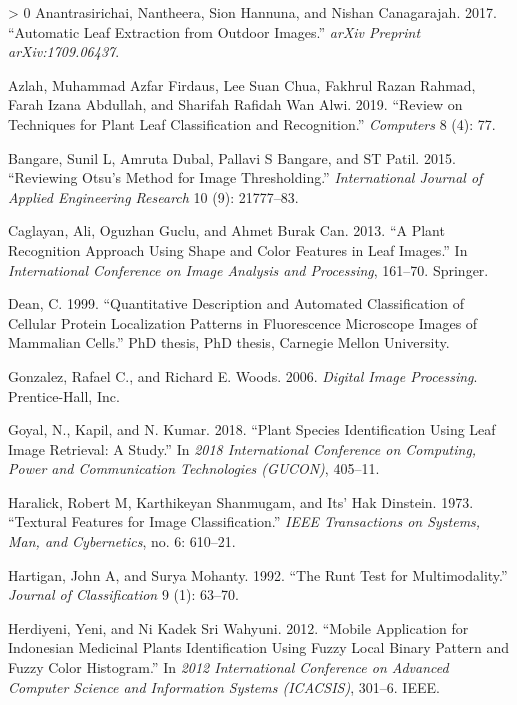 \documentclass{article}
\newlength{\cslhangindent}
\newenvironment{CSLReferences}[3] %
 {%
  \setlength{\parindent}{0pt}
  \ifodd #1 \everypar{\setlength{\hangindent}{\cslhangindent}}\ignorespaces\fi
  \ifnum #2 > 0
  \setlength{\parskip}{#2\baselineskip}
  \fi
 }%
 {}
\begin{document}
\hypertarget{refs}{}
\begin{CSLReferences}{1}{0}
\leavevmode\hypertarget{ref-DBLP}{}%
Anantrasirichai, Nantheera, Sion Hannuna, and Nishan Canagarajah. 2017.
{``Automatic Leaf Extraction from Outdoor Images.''} \emph{arXiv
Preprint arXiv:1709.06437}.

\leavevmode\hypertarget{ref-articlepl}{}%
Azlah, Muhammad Azfar Firdaus, Lee Suan Chua, Fakhrul Razan Rahmad,
Farah Izana Abdullah, and Sharifah Rafidah Wan Alwi. 2019. {``Review on
Techniques for Plant Leaf Classification and Recognition.''}
\emph{Computers} 8 (4): 77.

\leavevmode\hypertarget{ref-bangare2015reviewing}{}%
Bangare, Sunil L, Amruta Dubal, Pallavi S Bangare, and ST Patil. 2015.
{``Reviewing Otsu's Method for Image Thresholding.''}
\emph{International Journal of Applied Engineering Research} 10 (9):
21777--83.

\leavevmode\hypertarget{ref-inproceedings1}{}%
Caglayan, Ali, Oguzhan Guclu, and Ahmet Burak Can. 2013. {``A Plant
Recognition Approach Using Shape and Color Features in Leaf Images.''}
In \emph{International Conference on Image Analysis and Processing},
161--70. Springer.

\leavevmode\hypertarget{ref-article31}{}%
Dean, C. 1999. {``Quantitative Description and Automated Classification
of Cellular Protein Localization Patterns in Fluorescence Microscope
Images of Mammalian Cells.''} PhD thesis, PhD thesis, Carnegie Mellon
University.

\leavevmode\hypertarget{ref-book1}{}%
Gonzalez, Rafael C., and Richard E. Woods. 2006. \emph{Digital Image
Processing}. Prentice-Hall, Inc.

\leavevmode\hypertarget{ref-8675114}{}%
Goyal, N., Kapil, and N. Kumar. 2018. {``Plant Species Identification
Using Leaf Image Retrieval: A Study.''} In \emph{2018 International
Conference on Computing, Power and Communication Technologies (GUCON)},
405--11.

\leavevmode\hypertarget{ref-articletx}{}%
Haralick, Robert M, Karthikeyan Shanmugam, and Its' Hak Dinstein. 1973.
{``Textural Features for Image Classification.''} \emph{IEEE
Transactions on Systems, Man, and Cybernetics}, no. 6: 610--21.

\leavevmode\hypertarget{ref-hartigan1992runt}{}%
Hartigan, John A, and Surya Mohanty. 1992. {``The Runt Test for
Multimodality.''} \emph{Journal of Classification} 9 (1): 63--70.

\leavevmode\hypertarget{ref-inproceedings}{}%
Herdiyeni, Yeni, and Ni Kadek Sri Wahyuni. 2012. {``Mobile Application
for Indonesian Medicinal Plants Identification Using Fuzzy Local Binary
Pattern and Fuzzy Color Histogram.''} In \emph{2012 International
Conference on Advanced Computer Science and Information Systems
(ICACSIS)}, 301--6. IEEE.


\end{CSLReferences}
\end{document}
